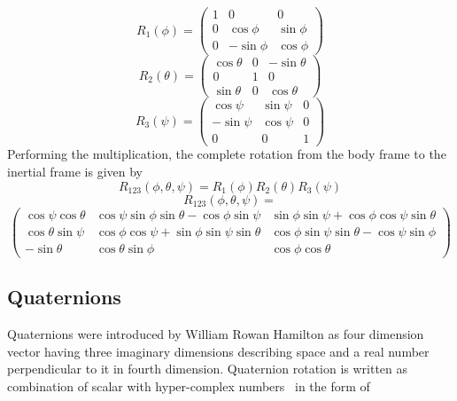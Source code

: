 \begin{equation*}
R_{1} (\phi )=\begin{pmatrix}
1 & 0 & 0\\
0 & \cos \phi  & \sin \phi \\
0 & -\sin \phi  & \cos \phi 
\end{pmatrix}
\end{equation*}
\begin{equation*}
R_{2} (\theta )=\begin{pmatrix}
\cos \theta  & 0 & -\sin \theta \\
0 & 1 & 0\\
\sin \theta  & 0 & \cos \theta 
\end{pmatrix}
\end{equation*}
\begin{equation*}
R_{3} (\psi )=\begin{pmatrix}
\cos \psi  & \sin \psi  & 0\\
-\sin \psi  & \cos \psi  & 0\\
0 & 0 & 1
\end{pmatrix}
\end{equation*}
Performing the multiplication, the complete rotation from the body frame to the inertial frame is given by
\begin{equation*}
    R_{123}( \phi ,\theta ,\psi ) =R_{1} (\phi )R_{2} (\theta )R_{3} (\psi )
\end{equation*}
\begin{equation*}
R_{123} (\phi ,\theta ,\psi )=
\end{equation*}
\begin{equation*}
    \begin{pmatrix}
\cos \psi \cos \theta  & \cos \psi \sin \phi \sin \theta -\cos \phi \sin \psi  & \sin \phi \sin \psi +\cos \phi \cos \psi \sin \theta \\
\cos \theta \sin \psi  & \cos \phi \cos \psi +\sin \phi \sin \psi \sin \theta  & \cos \phi \sin \psi \sin \theta -\cos \psi \sin \phi \\
-\sin \theta  & \cos \theta \sin \phi  & \cos \phi \cos \theta 
\end{pmatrix}
\end{equation*}

\subsection{Quaternions}
Quaternions were introduced by William Rowan Hamilton as four dimension vector having three imaginary dimensions describing space and a real number perpendicular to it in fourth dimension. Quaternion rotation is written as combination of scalar with hyper-complex numbers \ in the form of 


